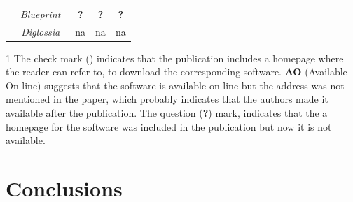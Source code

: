 \documentclass[conference]{IEEEtran}
\newcommand{\tick}{\ding{52}}
\begin{document}
\begin{table}
\begin{threeparttable}
\begin{small}
{\begin{tabular}{l|c|ccc}
  &   {\it Blueprint}~\cite{LV09} & {\bf ?} & {\bf ?} & {\bf ?} \\
  &   {\it Diglossia}~\cite{SMS13} & {\sc na} & {\sc na} & {\sc na} \\
	\hline
    \end{tabular}}
    \begin{tablenotes}
	\begin{footnotesize}
       \item[1] The check mark (\tick) indicates that the publication
       includes a homepage where the reader can refer to, to
       download the corresponding software. {\bf AO} (Available On-line) suggests
       that the software is available on-line but the
       address was not mentioned in the paper, which probably indicates that
       the authors made it available after the publication. The question ({\bf ?})
       mark, indicates that the a homepage for the software was included
       in the publication but now it is not available.
	\end{footnotesize}
    \end{tablenotes}
    \end{small}
    \end{threeparttable}
\end{table}

\section{Conclusions}




\end{document}
